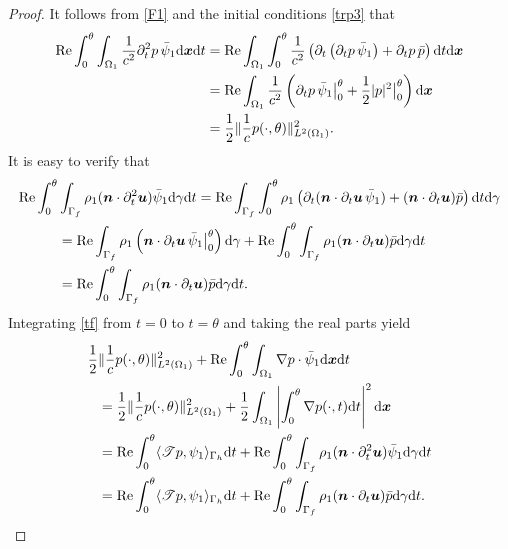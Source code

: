 \documentclass[final,leqno]{siamltex}
\begin{document}
\begin{proof}
It follows from \eqref{F1}  and the initial conditions \eqref{trp3}
that
\begin{align*}
 {\rm Re}\int_0^{\theta} \int_{\Omega_1}
 \frac{1}{c^2} \partial_t^2  p \,\bar \psi_1 {\rm d} \boldsymbol  x  {\rm d} t
 &= {\rm Re} \int_{\Omega_1} \int_0^{\theta} \frac{1}{c^2} \left(\partial_t
\left( \partial_t p \,\bar \psi_1\right) +\partial_t p\, \bar p \right){\rm d}
t{\rm d} \boldsymbol x \\
 &={\rm Re} \int_{\Omega_1} \frac{1}{c^2 } \left(  \partial_t p \,\bar {\psi}_1
\big|_{0}^{\theta} +\frac{1}{2} |p |^2 \big|_{0} ^{\theta}\right) {\rm d}
\boldsymbol  x\\
 &= \frac{1}{ 2} \| \frac{1}{c } p (\cdot, \theta)\|^2_{L^2 (\Omega_1)}.
\end{align*}
It is easy to verify that
\begin{align*}
 {\rm Re} \int_0^{\theta} &\int_{\Gamma_f} \rho_1 ( \boldsymbol n \cdot
\partial_t^2 \boldsymbol u) \bar \psi_1 {\rm d} \gamma {\rm d}t
 ={\rm Re } \int_{\Gamma_f} \int_0^{\theta} \rho_1 \left( \partial_t (
\boldsymbol n \cdot \partial_t \boldsymbol u\, \bar \psi_1) +
 (\boldsymbol n \cdot \partial_t \boldsymbol u) \bar p \right) {\rm d}t {\rm
d}\gamma \\
 &={\rm Re}\int_{\Gamma_f} \rho_1 \left( \boldsymbol n \cdot \partial_t
\boldsymbol u\,\bar {\psi}_1 \big|_0^{\theta} \right){\rm d}\gamma
 +{\rm Re}\int_0^{\theta} \int_{\Gamma_f} \rho_1 (\boldsymbol n \cdot \partial_t
\boldsymbol u) \bar p {\rm d} \gamma {\rm d} t\\
 &={\rm Re}\int_0^{\theta} \int_{\Gamma_f} \rho_1 (\boldsymbol n \cdot
\partial_t \boldsymbol u) \bar p {\rm d} \gamma {\rm d} t.
\end{align*}
Integrating \eqref{tf} from $t=0$ to $t=\theta$ and taking the real parts yield
\begin{align}
\frac{1}{2}&\|\frac{1}{c} p (\cdot, \theta)\|^2_{L^2 (\Omega_1)} +{\rm Re} \int_0^{\theta}
\int_{\Omega_1} \nabla p \cdot \bar {\psi}_1 {\rm d} \boldsymbol  x  {\rm d} t
\nonumber \\
 &= \frac{1}{2} \|\frac{1}{c} p (\cdot, \theta)\|^2_{L^2 (\Omega_1)}
+\frac{1}{2} \int_{\Omega_1} \left| \int_0^{\theta} \nabla p (\cdot, t) {\rm d}
t \right|^2 {\rm d} \boldsymbol x \nonumber\\
 &={\rm Re}\int_0^{\theta} \langle \mathscr T p, \psi_1 \rangle_{\Gamma_h} {\rm
d }t +{\rm Re} \int_0^{\theta} \int_{\Gamma_f} \rho_1 (\boldsymbol n \cdot
\partial_t^2 \boldsymbol u)\bar {\psi}_1 {\rm d} \gamma {\rm d} t \nonumber\\
 &= {\rm Re}\int_0^{\theta} \langle \mathscr T p, \psi_1 \rangle_{\Gamma_h} {\rm
d }t +{\rm Re}\int_0^{\theta} \int_{\Gamma_f} \rho_1 (\boldsymbol n \cdot
\partial_t \boldsymbol u) \bar p {\rm d} \gamma {\rm d} t.\label {en1}
\end{align}


\end{proof}
\end{document}
